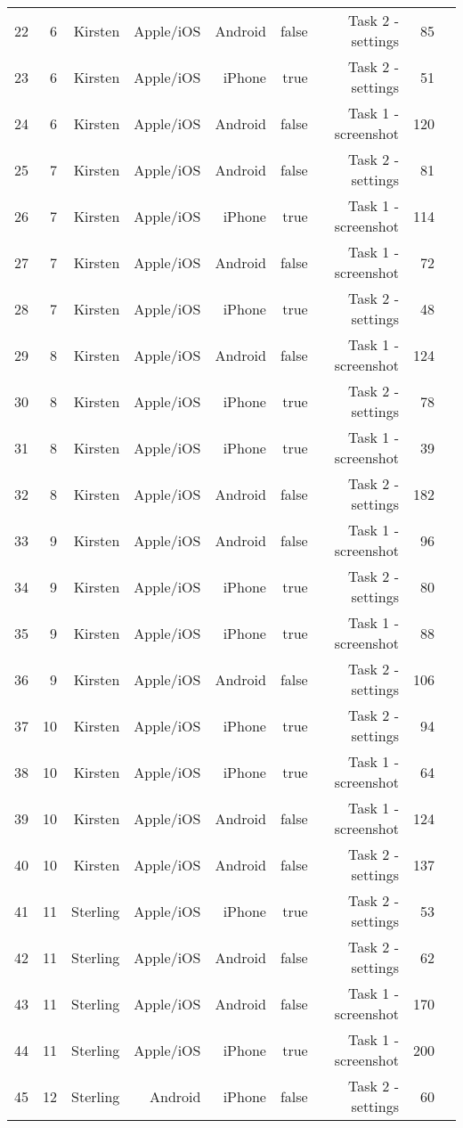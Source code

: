 \documentclass[conference]{IEEEtran}
\begin{document}
\begin{table}[!htp]
\begin{tabular}{lrrrrrrrr}
22 &6 &Kirsten &Apple/iOS &Android &false &Task 2 - settings &85 \\
23 &6 &Kirsten &Apple/iOS &iPhone &true &Task 2 - settings &51 \\
24 &6 &Kirsten &Apple/iOS &Android &false &Task 1 - screenshot &120 \\
25 &7 &Kirsten &Apple/iOS &Android &false &Task 2 - settings &81 \\
26 &7 &Kirsten &Apple/iOS &iPhone &true &Task 1 - screenshot &114 \\
27 &7 &Kirsten &Apple/iOS &Android &false &Task 1 - screenshot &72 \\
28 &7 &Kirsten &Apple/iOS &iPhone &true &Task 2 - settings &48 \\
29 &8 &Kirsten &Apple/iOS &Android &false &Task 1 - screenshot &124 \\
30 &8 &Kirsten &Apple/iOS &iPhone &true &Task 2 - settings &78 \\
31 &8 &Kirsten &Apple/iOS &iPhone &true &Task 1 - screenshot &39 \\
32 &8 &Kirsten &Apple/iOS &Android &false &Task 2 - settings &182 \\
33 &9 &Kirsten &Apple/iOS &Android &false &Task 1 - screenshot &96 \\
34 &9 &Kirsten &Apple/iOS &iPhone &true &Task 2 - settings &80 \\
35 &9 &Kirsten &Apple/iOS &iPhone &true &Task 1 - screenshot &88 \\
36 &9 &Kirsten &Apple/iOS &Android &false &Task 2 - settings &106 \\
37 &10 &Kirsten &Apple/iOS &iPhone &true &Task 2 - settings &94 \\
38 &10 &Kirsten &Apple/iOS &iPhone &true &Task 1 - screenshot &64 \\
39 &10 &Kirsten &Apple/iOS &Android &false &Task 1 - screenshot &124 \\
40 &10 &Kirsten &Apple/iOS &Android &false &Task 2 - settings &137 \\
41 &11 &Sterling &Apple/iOS &iPhone &true &Task 2 - settings &53 \\
42 &11 &Sterling &Apple/iOS &Android &false &Task 2 - settings &62 \\
43 &11 &Sterling &Apple/iOS &Android &false &Task 1 - screenshot &170 \\
44 &11 &Sterling &Apple/iOS &iPhone &true &Task 1 - screenshot &200 \\
45 &12 &Sterling &Android &iPhone &false &Task 2 - settings &60 \\

\end{tabular}
\end{table}
\end{document}
